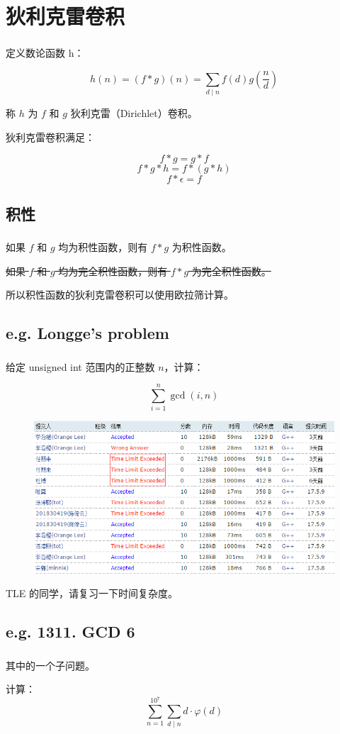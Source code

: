 \documentclass[UTF8]{beamer}
\begin{document}
	\section{狄利克雷卷积}
	\begin{frame}
		\frametitle{\insertsection}
		定义数论函数 h：

		$$
		h(n) = (f * g)(n) = \sum_{d \mid n} f(d)g(\frac {n} {d})
		$$

		称 $h$ 为 $f$ 和 $g$ 狄利克雷（Dirichlet）卷积。

		\pause
		\bigskip
		狄利克雷卷积满足：

		$$
		f * g = g * f
		$$
		$$
		f * g * h = f * (g * h)
		$$
		$$
		f * \epsilon = f
		$$
	\end{frame}

	\subsection{积性}
	\begin{frame}
		\frametitle{\insertsubsection}
		如果 $f$ 和 $g$ 均为积性函数，则有 $f * g$ 为积性函数。

		\pause
		\sout{如果 $f$ 和 $g$ 均为完全积性函数，则有 $f * g$ 为完全积性函数。}

		\pause
		\bigskip
		所以积性函数的狄利克雷卷积可以使用欧拉筛计算。
	\end{frame}
	
	\subsection{e.g. Longge's problem}
	\begin{frame}
		\frametitle{\insertsubsection}
		给定 unsigned int 范围内的正整数 $n$，计算：

		$$
		\sum_{i = 1}^{n} \gcd(i, n)
		$$
	\end{frame}

	\begin{frame}
		\begin{figure}[ht]
		\centering
		\includegraphics[scale=0.4]{pic/1.png}
		\end{figure}

		\begin{center}
			TLE 的同学，请复习一下时间复杂度。
		\end{center}
	\end{frame}

	\subsection{e.g. 1311. GCD 6}
	\begin{frame}
		\frametitle{\insertsubsection}
		其中的一个子问题。

		\bigskip
		计算：
		$$
		\sum_{n = 1}^{10^7}
		\sum_{d \mid n} d \cdot \varphi(d)
		$$
	\end{frame}
\end{document}

